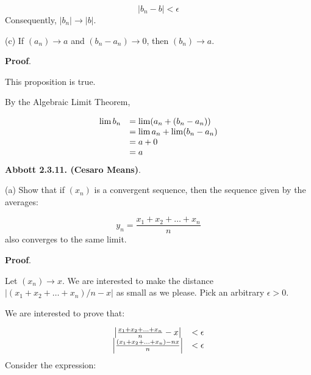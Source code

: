 \documentclass[10pt]{article}
\begin{document}
\begin{equation*}
|b_{n} -b|< \epsilon 
\end{equation*}
Consequently, $\displaystyle |b_{n} |\rightarrow |b|$.



(c) If $\displaystyle ( a_{n})\rightarrow a$ and $\displaystyle ( b_{n} -a_{n})\rightarrow 0$, then $\displaystyle ( b_{n})\rightarrow a$.



\textbf{Proof}.



This proposition is true. 



By the Algebraic Limit Theorem, 




\begin{equation*}
\begin{array}{ c l }
\lim b_{n} & =\lim ( a_{n} +( b_{n} -a_{n}))\\
 & =\lim a_{n} +\lim ( b_{n} -a_{n})\\
 & =a+0\\
 & =a
\end{array}
\end{equation*}
\textbf{Abbott 2.3.11. (Cesaro Means)}. 



(a) Show that if $\displaystyle ( x_{n})$ is a convergent sequence, then the sequence given by the averages:


\begin{equation*}
y_{n} =\frac{x_{1} +x_{2} +\dotsc +x_{n}}{n}
\end{equation*}
also converges to the same limit.



\textbf{Proof}.



Let $\displaystyle ( x_{n})\rightarrow x$. We are interested to make the distance $\displaystyle |( x_{1} +x_{2} +\dotsc +x_{n}) /n-x|$ as small as we please. Pick an arbitrary $\displaystyle \epsilon  >0$. 



We are interested to prove that:


\begin{equation*}
\begin{array}{ c c }
\left| \frac{x_{1} +x_{2} +\dotsc +x_{n}}{n} -x\right|  & < \epsilon \\
\left| \frac{( x_{1} +x_{2} +\dotsc +x_{n}) -nx}{n}\right|  & < \epsilon 
\end{array}
\end{equation*}
Consider the expression:
\end{document}
